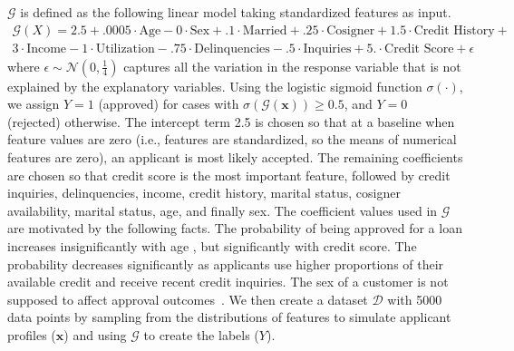 \documentclass[mnsc,blindrev]{informs3}
\begin{document}
    $\mathcal{G}$ is defined as the following linear model taking standardized features as input. 
    \begin{equation}
    \label{eqn:gt}
    \begin{split}
    \mathcal{G}(X) =2.5 +.0005\cdot\text{Age} -0\cdot\text{Sex} +.1 \cdot \text{Married} + .25\cdot \text{Cosigner} + 1.5 \cdot \text{Credit History} + \\   3 \cdot \text{Income} - 1\cdot\text{Utilization} -.75 \cdot \text{Delinquencies} - .5\cdot\text{Inquiries} + 5.\cdot\text{Credit Score} + \epsilon
    \end{split}
    \end{equation}
    \noindent where $\epsilon \sim \mathcal{N}(0,\frac{1}{4})$ captures all the variation in the response variable that is not explained by the explanatory variables.
    Using the logistic sigmoid function $\sigma(\cdot)$, we assign $Y = 1$ (approved) for cases with $\sigma(\mathcal{G}(\mathbf{x}))\geq 0.5$, and $Y = 0$ (rejected) otherwise. The intercept term 2.5 is chosen so that at a baseline when feature values are zero (i.e., features are standardized, so the means of numerical features are zero), an applicant is most likely accepted. The remaining coefficients are chosen so that credit score is the most important feature, followed by credit inquiries, delinquencies, income, credit history, marital status, cosigner availability, marital status, age, and finally sex. The coefficient values used in $\mathcal{G}$ are motivated by the following facts. The probability of being approved for a loan increases insignificantly with age \citep{cfb_age}, but significantly with credit score. The probability decreases significantly as applicants use higher proportions of their available credit and receive recent credit inquiries. The sex of a customer is not supposed to affect approval outcomes~\citep{Calcagnini2014}. 
   We then create a dataset $\mathcal{D}$ with 5000 data points by sampling from the distributions of features to simulate applicant profiles ($\mathbf{x}$) and using $\mathcal{G}$ to create the labels ($Y$). 
\end{document}
